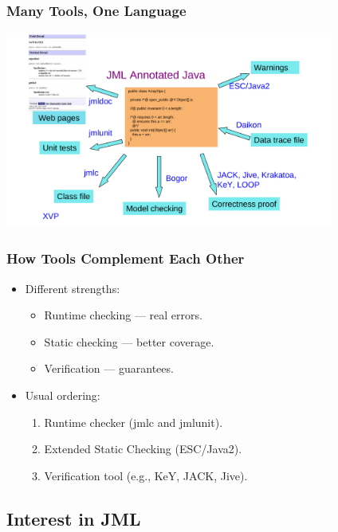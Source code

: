 \begin{frame}
\frametitle{Many Tools, One Language}
\includegraphics[width=4.25in]{tools-overview}
\end{frame}

\begin{frame}
\frametitle{How Tools Complement Each Other}
\begin{itemize}
\item
Different strengths:
\begin{itemize}
\item
Runtime checking --- real errors.

\item
Static checking --- better coverage.

\item
Verification --- guarantees.
\end{itemize}

\item
Usual ordering:
\begin{enumerate}
\item
Runtime checker (jmlc and jmlunit).

\item
Extended Static Checking (ESC/Java2).

\item
Verification tool (e.g., KeY, JACK, Jive).
\end{enumerate}
\end{itemize}
\end{frame}

\subsection[Interest]{Interest in JML}

